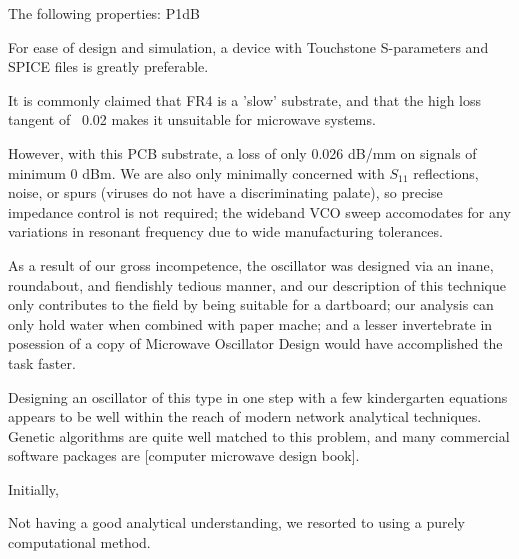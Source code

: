 \documentclass[fleqn,10pt]{article}
\begin{document}
\clearpage
\begin{multicols}{1}

\noindent{}
%
The following properties: P1dB

For ease of design and simulation, a device with Touchstone S-parameters and SPICE files is greatly preferable.

It is commonly claimed that FR4 is a 'slow' substrate, and that the high loss tangent of ~0.02 makes it unsuitable for microwave systems.

However, with this PCB substrate, a loss of only 0.026 dB/mm on signals of minimum 0 dBm. We are also only minimally concerned with $S_{11}$ reflections, noise, or spurs (viruses do not have a discriminating palate), so precise impedance control is not required; the wideband VCO sweep accomodates for any variations in resonant frequency due to wide manufacturing tolerances.

As a result of our gross incompetence, the oscillator was designed via an inane, roundabout, and fiendishly tedious manner, and our description of this technique only contributes to the field by being suitable for a dartboard; our analysis can only hold water when combined with paper mache; and a lesser invertebrate in posession of a copy of Microwave Oscillator Design would have accomplished the task faster.

Designing an oscillator of this type in one step with a few kindergarten equations appears to be well within the reach of modern network analytical techniques. Genetic algorithms are quite well matched to this problem, and many commercial software packages are  [computer microwave design book]. 

Initially, 

Not having a good analytical understanding, we resorted to using a purely computational method.


\end{multicols}
\end{document}
